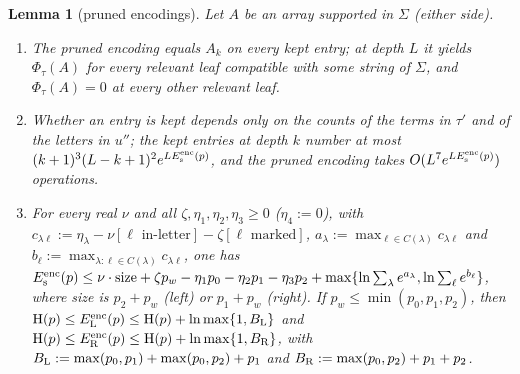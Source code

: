 \documentclass[11pt]{article}
\newtheorem{lemma}[theorem]{Lemma}
\theoremstyle{definition}
\theoremstyle{remark}
\newcommand{\Hh}{\mathrm{H}}
\begin{document}
\begin{lemma}[pruned encodings]\label{t:lem:pe}
Let $A$ be an array supported in $\Sigma$ (either side).
\begin{enumerate}[label=(\alph*),nosep]
\item The pruned encoding equals $A_k$ on every kept entry; at depth $L$ it yields $\Phi_\tau(A)$ for every relevant leaf compatible with some string of $\Sigma$, and $\Phi_\tau(A)=0$ at every other relevant leaf.
\item Whether an entry is kept depends only on the counts of the terms in $\tau'$ and of the letters in $u''$; the kept entries at depth $k$ number at most $(k+1)^3(L-k+1)^2e^{LE^{\rm enc}_{\rm s}(p)}$, and the pruned encoding takes $O(L^7e^{LE^{\rm enc}_{\rm s}(p)})$ operations.
\item For every real $\nu$ and all $\zeta,\eta_1,\eta_2,\eta_3\ge0$ ($\eta_4:=0$), with $c_{\lambda\ell}:=\eta_\lambda-\nu[\ell\text{ in-letter}]-\zeta[\ell\text{ marked}]$, $a_\lambda:=\max_{\ell\in C(\lambda)}c_{\lambda\ell}$ and $b_\ell:=\max_{\lambda:\ell\in C(\lambda)}c_{\lambda\ell}$, one has $E^{\rm enc}_{\rm s}(p)\le\nu\cdot\mathrm{size}+\zeta p_w-\eta_1p_0-\eta_2p_1-\eta_3p_2+\max\{\ln\sum_\lambda e^{a_\lambda},\ln\sum_\ell e^{b_\ell}\}$, where size is $p_2+p_w$ (left) or $p_1+p_w$ (right). If $p_w\le\min(p_0,p_1,p_2)$, then $\Hh(p)\le E^{\rm enc}_{\rm L}(p)\le\Hh(p)+\ln\max\{1,B_{\rm L}\}$ and $\Hh(p)\le E^{\rm enc}_{\rm R}(p)\le\Hh(p)+\ln\max\{1,B_{\rm R}\}$, with $B_{\rm L}:=\max(p_0,p_1)+\max(p_0,p_2)+p_1$ and $B_{\rm R}:=\max(p_0,p_2)+p_1+p_2$.
\end{enumerate}
\end{lemma}
\end{document}
